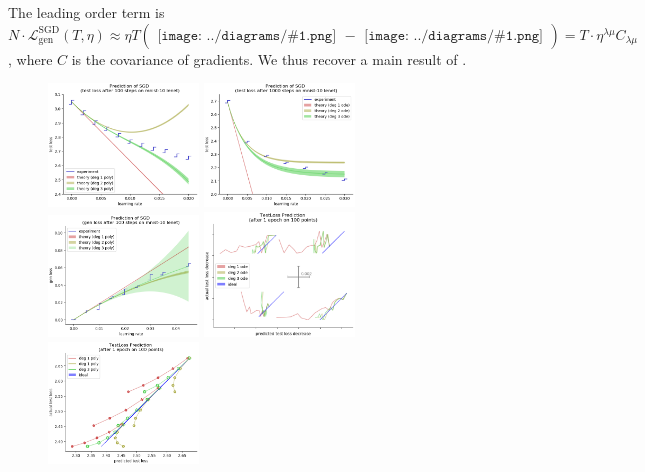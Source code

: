\documentclass{article}
\newcommand{\wrap}[1]{\left( #1 \right)}
\newcommand{\sdia}[1]{\begin{gathered}\texttt{[image: ../diagrams/\#1.png]}\end{gathered}}
\begin{document}
    The leading order term is $N \cdot \mathcal{L}^{\text{SGD}}_\text{gen}(T, \eta) \approx \eta T \wrap{\sdia{(01)(01)} - \sdia{(0-1)(01)}} = T \cdot \eta^{\lambda\mu} C_{\lambda\mu}$,
    where $C$ is the covariance of gradients.  We thus recover a main result of \citet{ro18}.
    \begin{figure}[h!]
        \centering
        \includegraphics[width=4.0cm, trim={0 0 0 1.0cm}, clip]{test-lenet-07-poly}
        \includegraphics[width=4.0cm, trim={0 0 0 1.0cm}, clip]{test-lenet-long-06-ode} \\
        \includegraphics[width=4.0cm, trim={0 0 0 1.0cm}, clip]{gene-lenet-02-poly} 
        \includegraphics[width=4.0cm, trim={0 0 0 1.0cm}, clip]{test-loss-converged} \\
        \includegraphics[width=4.0cm, trim={0 0 0 1.0cm}, clip]{test-loss}

\end{figure}
\end{document}

